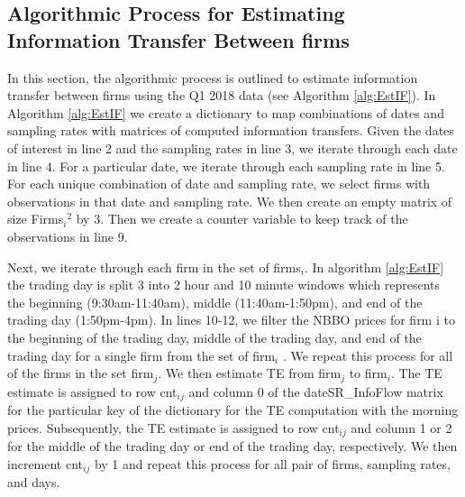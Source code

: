 \subsection{Algorithmic Process for Estimating Information Transfer Between firms}

In this section, the algorithmic process is outlined to estimate information transfer between firms using the Q1 2018 data (see Algorithm \ref{alg:EstIF}).  In Algorithm \ref{alg:EstIF}  we create a dictionary to map combinations of dates and sampling rates with matrices of computed information transfers.  Given the dates of interest in line 2 and the sampling rates in line 3, we iterate through each date in line 4.  For a particular date, we iterate through each sampling rate in line 5.  For each unique combination of date and sampling rate, we select firms with observations in that date and sampling rate. We then create an empty matrix of size Firms\(_i\)\(^2\) by 3.  Then we create a counter variable to keep track of the observations in line 9. 


Next, we iterate through each firm in the set of firms\(_i\).  In algorithm \ref{alg:EstIF} the trading day is split 3 into 2 hour and 10 minute windows which represents the beginning (9:30am-11:40am),  middle (11:40am-1:50pm),  and end of the trading day (1:50pm-4pm).  In lines 10-12, we filter the NBBO prices for firm i to the beginning of the trading day,  middle of the trading day, and end of the trading day for a single firm from the set of firm\(_i\) . We repeat this process for all of the firms in the set firm\(_j\). We then estimate TE from firm\(_j\) to firm\(_i\).   The TE estimate is assigned to row cnt\(_{ij}\) and column 0 of the dateSR\_InfoFlow matrix for the particular key of the dictionary for the TE computation with the morning prices.  Subsequently, the TE estimate is assigned to row cnt\(_{ij}\) and column 1 or 2 for the middle of the trading day or end of the trading day, respectively.   We then increment cnt\(_{ij}\) by 1 and repeat this process for all pair of firms, sampling rates, and days.   \\


